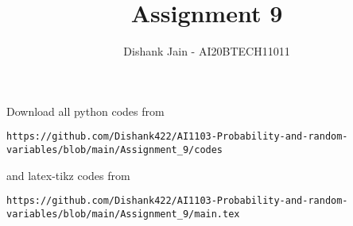 \documentclass[journal,12pt,twocolumn]{IEEEtran}
\DeclareMathOperator*{\Res}{Res}
\begin{document}
\newcommand{\BEQA}{\begin{eqnarray}}
\newcommand{\EEQA}{\end{eqnarray}}
\newcommand{\define}{\stackrel{\triangle}{=}}

\raggedbottom
\setlength{\parindent}{0pt}
\providecommand{\mbf}{\mathbf}
\providecommand{\pr}[1]{\ensuremath{\Pr\left(#1\right)}}
\providecommand{\qfunc}[1]{\ensuremath{Q\left(#1\right)}}
\providecommand{\sbrak}[1]{\ensuremath{{}\left[#1\right]}}
\providecommand{\lsbrak}[1]{\ensuremath{{}\left[#1\right.}}
\providecommand{\rsbrak}[1]{\ensuremath{{}\left.#1\right]}}
\providecommand{\brak}[1]{\ensuremath{\left(#1\right)}}
\providecommand{\lbrak}[1]{\ensuremath{\left(#1\right.}}
\providecommand{\rbrak}[1]{\ensuremath{\left.#1\right)}}
\providecommand{\cbrak}[1]{\ensuremath{\left\{#1\right\}}}
\providecommand{\lcbrak}[1]{\ensuremath{\left\{#1\right.}}
\providecommand{\rcbrak}[1]{\ensuremath{\left.#1\right\}}}
\theoremstyle{remark}
\newtheorem{rem}{Remark}
\newcommand{\sgn}{\mathop{\mathrm{sgn}}}
\providecommand{\abs}[1]{\vert#1\vert}
\providecommand{\res}[1]{\Res\displaylimits_{#1}} 
\providecommand{\norm}[1]{\lVert#1\rVert}
\providecommand{\mtx}[1]{\mathbf{#1}}
\providecommand{\mean}[1]{E[ #1 ]}
\providecommand{\fourier}{\overset{\mathcal{F}}{ \rightleftharpoons}}
\providecommand{\system}{\overset{\mathcal{H}}{ \longleftrightarrow}}
\newcommand{\solution}{\noindent \textbf{Solution: }}
\newcommand{\cosec}{\,\text{cosec}\,}
\providecommand{\dec}[2]{\ensuremath{\overset{#1}{\underset{#2}{\gtrless}}}}
\newcommand{\myvec}[1]{\ensuremath{\begin{pmatrix}#1\end{pmatrix}}}
\newcommand{\mydet}[1]{\ensuremath{\begin{vmatrix}#1\end{vmatrix}}}
\makeatletter
{}
\makeatother
\let\StandardTheFigure\thefigure
\let\vec\mathbf
\renewcommand{\thefigure}{\theproblem}
\def\putbox#1#2#3{\makebox[0in][l]{\makebox[#1][l]{}\raisebox{\baselineskip}[0in][0in]{\raisebox{#2}[0in][0in]{#3}}}}
     \def\rightbox#1{\makebox[0in][r]{#1}}
     \def\centbox#1{\makebox[0in]{#1}}
     \def\topbox#1{\raisebox{-\baselineskip}[0in][0in]{#1}}
     \def\midbox#1{\raisebox{-0.5\baselineskip}[0in][0in]{#1}}
\vspace{3cm}
\title{Assignment 9}
\author{Dishank Jain - AI20BTECH11011}
\maketitle
\newpage
\bigskip
\renewcommand{\thefigure}{\theenumi}
\renewcommand{\thetable}{\theenumi}
Download all python codes from 
\begin{lstlisting}
https://github.com/Dishank422/AI1103-Probability-and-random-variables/blob/main/Assignment_9/codes
\end{lstlisting}
%
and latex-tikz codes from 
%
\begin{lstlisting}
https://github.com/Dishank422/AI1103-Probability-and-random-variables/blob/main/Assignment_9/main.tex
\end{lstlisting}
\end{document}
